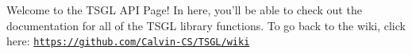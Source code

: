\-Welcome to the \-T\-S\-G\-L \-A\-P\-I \-Page! \-In here, you'll be able to check out the documentation for all of the \-T\-S\-G\-L library functions. \-To go back to the wiki, click here\-: \href{https://github.com/Calvin-CS/TSGL/wiki}{\tt https\-://github.\-com/\-Calvin-\/\-C\-S/\-T\-S\-G\-L/wiki}